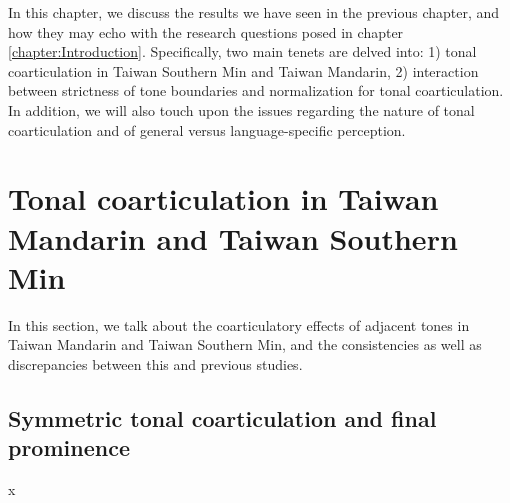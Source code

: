 \documentclass[12pt]{report}
\begin{document}
\begin{CJK}{UTF8}{bsmi}
In this chapter, we discuss the results we have seen in the previous chapter, and how they may echo with the research questions posed in chapter \ref{chapter:Introduction}. Specifically, two main tenets are delved into: 1) tonal coarticulation in Taiwan Southern Min and Taiwan Mandarin, 2) interaction between strictness of tone boundaries and normalization for tonal coarticulation. In addition, we will also touch upon the issues regarding the nature of tonal coarticulation and of general versus language-specific perception.

\section{Tonal coarticulation in Taiwan Mandarin and Taiwan Southern Min}

In this section, we talk about the coarticulatory effects of adjacent tones in Taiwan Mandarin and Taiwan Southern Min, and the consistencies as well as discrepancies between this and previous studies.

\subsection{Symmetric tonal coarticulation and final prominence}

x

\end{CJK}
\end{document}
